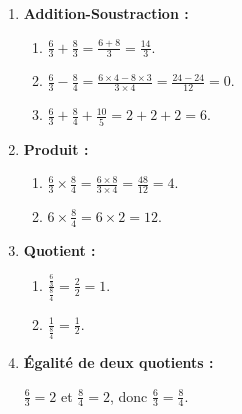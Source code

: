 \documentclass[12pt]{article}
\newcounter{exemple}
\newcommand{\exemple}{%
  \refstepcounter{exemple}%
  \textbf{\textcolor{orange}{Exemple \theexemple : }} \ignorespaces
}
\newcounter{solution}
\newcommand{\solution}{%
  \refstepcounter{solution}%
  \textbf{\textcolor{orange}{Solution \thesolution : }} \ignorespaces
}
\newcounter{exerciceapp}
\newcommand{\exerciceapp}{%
  \refstepcounter{exerciceapp}%
  \textbf{\textcolor{myorange}{Exercice d'application \theexerciceapp :}} \ignorespaces
}
\newcounter{correction}
\newcommand{\correction}{%
  \refstepcounter{correction}%
  \textbf{\textcolor{myorange}{Correction \thecorrection :}} \ignorespaces
}
\newcounter{remarque}
\newcommand{\remarque}{%
  \refstepcounter{remarque}%
  \textbf{\textcolor{myorange1}{Remarque \theremarque :}} \ignorespaces
}
\begin{document}
\begin{enumerate}
    \item \textbf{Addition-Soustraction :}
        \begin{enumerate}
            \item $\frac{6}{3} + \frac{8}{3} = \frac{6 + 8}{3} = \frac{14}{3}$.
            \item $\frac{6}{3} - \frac{8}{4} = \frac{6 \times 4 - 8 \times 3}{3 \times 4} = \frac{24 - 24}{12} = 0$.
            \item $\frac{6}{3} + \frac{8}{4} + \frac{10}{5} = 2 + 2 + 2 = 6$.
        \end{enumerate}
    
    \item \textbf{Produit :}
        \begin{enumerate}
            \item $\frac{6}{3} \times \frac{8}{4} = \frac{6 \times 8}{3 \times 4} = \frac{48}{12} = 4$.
            \item $6 \times \frac{8}{4} = 6 \times 2 = 12$.
        \end{enumerate}
    
    \item \textbf{Quotient :}
        \begin{enumerate}
            \item $\frac{\frac{6}{3}}{\frac{8}{4}} = \frac{2}{2} = 1$.
            \item $\frac{1}{\frac{8}{4}} = \frac{1}{2}$.
        \end{enumerate}
    
    \item \textbf{Égalité de deux quotients :}
    
    $\frac{6}{3} = 2$ et $\frac{8}{4} = 2$, donc $\frac{6}{3} = \frac{8}{4}$.
\end{enumerate}





\end{document}
